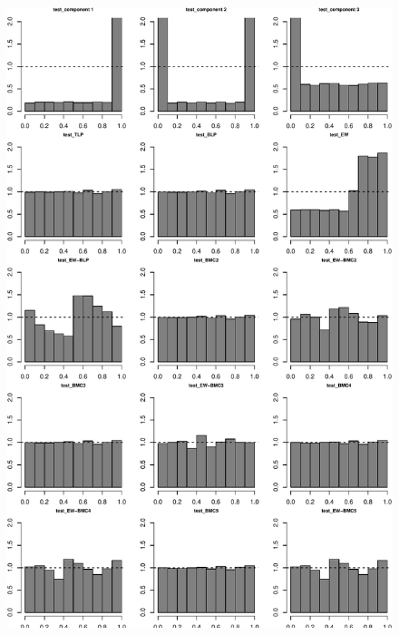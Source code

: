 \documentclass[
]{article}
\begin{document}
\begin{figure}[h]

{\centering \includegraphics{applied_blp_sim_files/figure-latex/unnamed-chunk-14-1} 

}

\end{figure}

\clearpage
\end{document}

